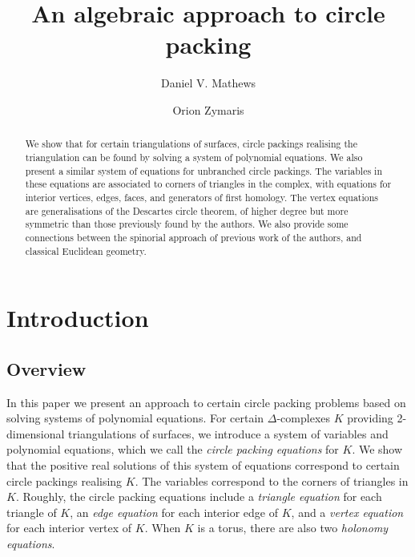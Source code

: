 \documentclass[12pt]{amsart}
\title{An algebraic approach to circle packing}
\author{Daniel V. Mathews}
\author{Orion Zymaris}
\numberwithin{equation}{section}
\theoremstyle{named}
\begin{document}
\begin{abstract}
We show that for certain triangulations of surfaces, circle packings realising the triangulation can be found by solving a system of polynomial equations. We also present a similar system of equations for unbranched circle packings. The variables in these equations are associated to corners of triangles in the complex, with equations for interior vertices, edges, faces, and generators of first homology. The vertex equations are generalisations of the Descartes circle theorem, of higher degree but more symmetric than those previously found by the authors. We also provide some connections between the spinorial approach of previous work of the authors, and classical Euclidean geometry.
\end{abstract}

\maketitle

\setcounter{tocdepth}{1}
\tableofcontents

\section{Introduction}

\subsection{Overview}

In this paper we present an approach to certain circle packing problems based on solving systems of polynomial equations. For certain $\Delta$-complexes $K$ providing 2-dimensional triangulations of surfaces, we introduce a system of variables and polynomial equations, which we call the \emph{circle packing equations} for $K$. We show that the positive real solutions of this system of equations correspond to certain circle packings realising $K$. The variables correspond to the corners of triangles in $K$. Roughly, the circle packing equations include a \emph{triangle equation} for each triangle of $K$, an \emph{edge equation} for each interior edge of $K$, and a \emph{vertex equation} for each interior vertex of $K$. When $K$ is a torus, there are also two \emph{holonomy equations}. 
\end{document}
